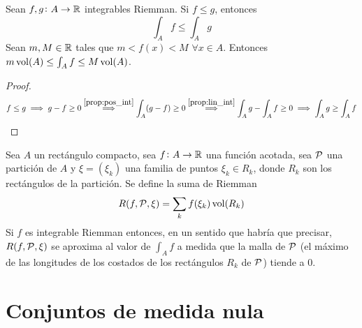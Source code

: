 \begin{col}
	Sean $f,g \colon A \to \mathbb{R}$ integrables Riemman. Si $f \leq g$, entonces
	\[
		\int_A f \leq \int_A g
	\]
	Sean $m,M \in \mathbb{R}$ tales que $m < f(x) < M$ $\forall x \in A$. Entonces
	$m\operatorname{vol}(A) \leq \int_A f \leq M\operatorname{vol}(A)$.
\end{col}

\begin{proof}
	\[
		f \leq g \implies g - f \geq 0 \stackrel{\ref{prop:pos_int}}{\implies}
		\int_A (g-f) \geq 0 \stackrel{\ref{prop:lin_int}}{\implies} \int_A g -
		\int_A f \geq 0 \implies \int_A g \geq \int_A f
	\]
\end{proof}

\begin{prop}
	Sea $A$ un rectángulo compacto, sea $f \colon A \to \mathbb{R}$ una función acotada,
	sea $\mathcal{P}$ una partición de $A$ y $\xi = \left(\xi_k\right)$ una familia de
	puntos $\xi_k \in R_k$, donde $R_k$ son los rectángulos de la partición. Se
	define la suma de Riemman
	\[
		R(f,\mathcal{P},\xi) = \sum_k f(\xi_k)\operatorname{vol}(R_k) 
	\]
	Si $f$ es integrable Riemman entonces, en un sentido que habría que precisar,
	$R(f,\mathcal{P},\xi)$ se aproxima al valor de $\int_A f$ a medida que la malla de
	$\mathcal{P}$ (el máximo de las longitudes de los costados de los rectángulos $R_k$ de
	$\mathcal{P}$) tiende a 0.
\end{prop}

\section{Conjuntos de medida nula}

